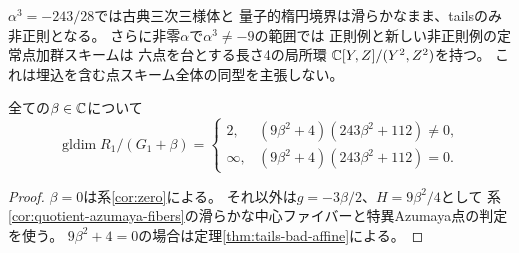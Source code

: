 \begin{remark}
$\alpha^3=-243/28$では古典三次三様体と
量子的楕円境界は滑らかなまま、tailsのみ非正則となる。
さらに非零$\alpha$で$\alpha^3\ne-9$の範囲では
正則例と新しい非正則例の定常点加群スキームは
六点を台とする長さ4の局所環
$\mathbb C[Y,Z]/(Y^2,Z^2)$を持つ。
これは埋込を含む点スキーム全体の同型を主張しない。
\end{remark}


\begin{corollary}[全affine中心値の必要十分判別式]
\label{cor:tails-all-affine}
全ての$\beta\in\mathbb C$について
\[
 \operatorname{gldim}R_1/(G_1+\beta)
 =\begin{cases}
 2,&(9\beta^2+4)(243\beta^2+112)\ne0,\\
 \infty,&(9\beta^2+4)(243\beta^2+112)=0.
 \end{cases}
\]
\end{corollary}
\begin{proof}
$\beta=0$は系\ref{cor:zero}による。
それ以外は$g=-3\beta/2$、$H=9\beta^2/4$として
系\ref{cor:quotient-azumaya-fibers}の滑らかな中心ファイバーと特異Azumaya点の判定を使う。
$9\beta^2+4=0$の場合は定理\ref{thm:tails-bad-affine}による。
\end{proof}
